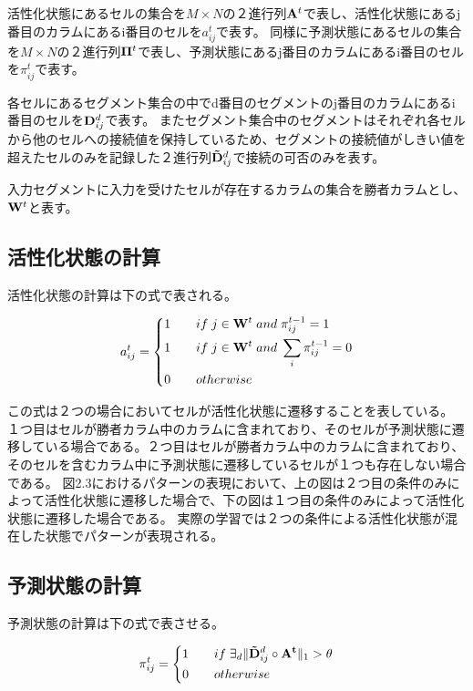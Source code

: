 活性化状態にあるセルの集合を$M \times N$の２進行列${\bf A}^t$で表し、活性化状態にあるj番目のカラムにあるi番目のセルを$a^t_{ij}$で表す。
同様に予測状態にあるセルの集合を$M \times N$の２進行列${\bf \Pi}^t$で表し、予測状態にあるj番目のカラムにあるi番目のセルを$\pi^t_{ij}$で表す。

各セルにあるセグメント集合の中でd番目のセグメントのj番目のカラムにあるi番目のセルを${\bf D}^d_{ij}$で表す。
またセグメント集合中のセグメントはそれぞれ各セルから他のセルへの接続値を保持しているため、セグメントの接続値がしきい値を超えたセルのみを記録した２進行列${\bf \tilde{D}}^d_{ij}$で接続の可否のみを表す。

入力セグメントに入力を受けたセルが存在するカラムの集合を勝者カラムとし、${\bf W}^t$と表す。

\subsection{活性化状態の計算}
活性化状態の計算は下の式で表される。

\begin{equation}
  a^t_{ij} =
  \left\{
  \begin{alignedat}{3}
    1 \qquad &if \; j\in{\bf W}^t \; and \; \pi^{t-1}_{ij} = 1\\
    1 \qquad &if \; j\in{\bf W}^t \; and \; \sum_i \pi^{t-1}_{ij} = 0\\
    0 \qquad &otherwise
  \end{alignedat}
  \right.
\end{equation}

この式は２つの場合においてセルが活性化状態に遷移することを表している。
１つ目はセルが勝者カラム中のカラムに含まれており、そのセルが予測状態に遷移している場合である。２つ目はセルが勝者カラム中のカラムに含まれており、そのセルを含むカラム中に予測状態に遷移しているセルが１つも存在しない場合である。
図2.3におけるパターンの表現において、上の図は２つ目の条件のみによって活性化状態に遷移した場合で、下の図は１つ目の条件のみによって活性化状態に遷移した場合である。
実際の学習では２つの条件による活性化状態が混在した状態でパターンが表現される。

\subsection{予測状態の計算}
予測状態の計算は下の式で表させる。

\begin{equation}
  \pi^t_{ij} =
  \left\{
  \begin{alignedat}{2}
    1 \qquad &if \; \exists_d\|{\bf \tilde{D}}^d_{ij} \circ {\bf A^t}\|_1 > \theta\\
    0 \qquad &otherwise
  \end{alignedat}
  \right.
\end{equation}

